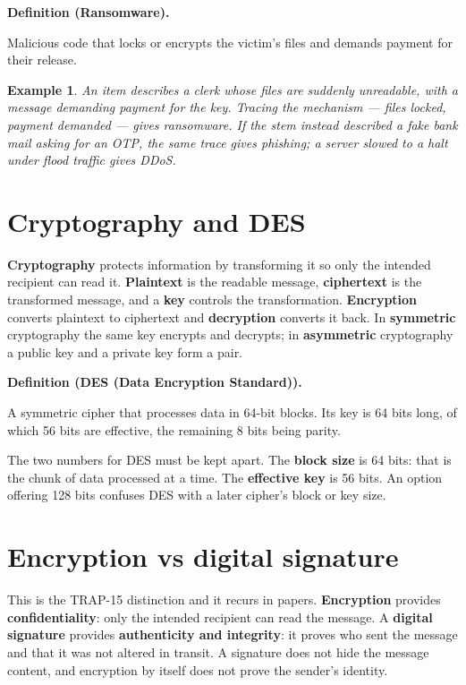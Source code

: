 \documentclass[11pt]{article}
\newtheorem{example}{Example}[section]
\newenvironment{definitionbox}[1]{%
  \par\noindent\textbf{Definition (#1).}\ \itshape
}{\par\vspace{0.3em}}
\begin{document}
\begin{definitionbox}{Ransomware}
Malicious code that locks or encrypts the victim's files and demands payment
for their release.
\end{definitionbox}

\begin{example}
An item describes a clerk whose files are suddenly unreadable, with a message
demanding payment for the key. Tracing the mechanism --- files locked,
payment demanded --- gives ransomware. If the stem instead described a fake
bank mail asking for an OTP, the same trace gives phishing; a server slowed to
a halt under flood traffic gives DDoS.
\end{example}

\section{Cryptography and DES}
\textbf{Cryptography} protects information by transforming it so only the
intended recipient can read it. \textbf{Plaintext} is the readable message,
\textbf{ciphertext} is the transformed message, and a \textbf{key} controls
the transformation. \textbf{Encryption} converts plaintext to ciphertext and
\textbf{decryption} converts it back. In \textbf{symmetric} cryptography the
same key encrypts and decrypts; in \textbf{asymmetric} cryptography a public
key and a private key form a pair.

\begin{definitionbox}{DES (Data Encryption Standard)}
A symmetric cipher that processes data in 64-bit blocks. Its key is 64 bits
long, of which 56 bits are effective, the remaining 8 bits being parity.
\end{definitionbox}

The two numbers for DES must be kept apart. The \textbf{block size} is 64
bits: that is the chunk of data processed at a time. The \textbf{effective
key} is 56 bits. An option offering 128 bits confuses DES with a later
cipher's block or key size.

\section{Encryption vs digital signature}
This is the TRAP-15 distinction and it recurs in papers. \textbf{Encryption}
provides \textbf{confidentiality}: only the intended recipient can read the
message. A \textbf{digital signature} provides \textbf{authenticity and
integrity}: it proves who sent the message and that it was not altered in
transit. A signature does not hide the message content, and encryption by
itself does not prove the sender's identity.
\end{document}
